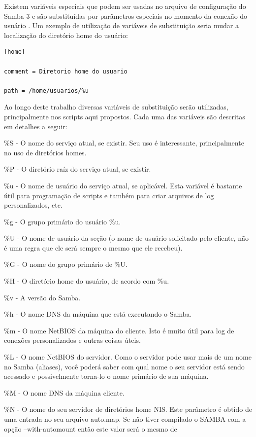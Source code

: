 Existem variáveis especiais que podem ser usadas no arquivo de configuração do Samba 3 e são substituídas por parâmetros especiais no momento da conexão do usuário \cite{FOCA}. Um exemplo de utilização de variáveis de substituição seria mudar a localização do diretório home do usuário:\\

\begin{lstlisting}	
[home]
	
comment = Diretorio home do usuario

path = /home/usuarios/%u
\end{lstlisting}          

Ao longo deste trabalho diversas variáveis de substituição serão utilizadas, principalmente nos scripts aqui propostos. Cada uma das variáveis são descritas em detalhes a seguir:

\%S - O nome do serviço atual, se existir. Seu uso é interessante, principalmente no uso de diretórios homes.

\%P - O diretório raíz do serviço atual, se existir.

\%u - O nome de usuário do serviço atual, se aplicável. Esta variável é bastante útil para programação de scripts e também para criar arquivos de log personalizados, etc.

\%g - O grupo primário do usuário \%u.

\%U - O nome de usuário da seção (o nome de usuário solicitado pelo cliente, não é uma regra que ele será sempre o mesmo que ele recebeu).

\%G - O nome do grupo primário de \%U.

\%H - O diretório home do usuário, de acordo com \%u.

\%v - A versão do Samba.

\%h - O nome DNS da máquina que está executando o Samba.

\%m - O nome NetBIOS da máquina do cliente. Isto é muito útil para log de conexões personalizados e outras coisas úteis.

\%L - O nome NetBIOS do servidor. Como o servidor pode usar mais de um nome no Samba (aliases), você poderá saber com qual nome o seu servidor está sendo acessado e possivelmente torna-lo o nome primário de sua máquina.

\%M - O nome DNS da máquina cliente.

\%N - O nome do seu servidor de diretórios home NIS. Este parâmetro é obtido de uma entrada no seu arquivo auto.map. Se não tiver compilado o SAMBA com a opção --with-automount então este valor será o mesmo de %

